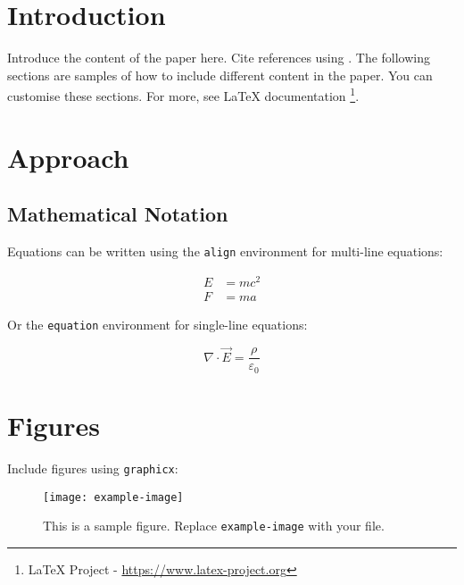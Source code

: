 \documentclass[twoside]{article}
\title{\customtitle{Your Paper Title}}
\author{
    Author One$^1$, Author Two$^2$, Author Three$^1$ \\
    {$^1$Affiliation One, $^2$Affiliation Two} \\
    \texttt{author.one@example.com, author.two@example.com, author.three@example.com}
}
\date{}
\begin{document}
\maketitle

\begin{abstract}
This is the abstract. It summarises the paper's key contributions in a maximum of 200 words.
\end{abstract}


\section{Introduction}

Introduce the content of the paper here. Cite references using \cite{example}. The following sections are samples of how to include different content in the paper. You can customise these sections. For more, see LaTeX documentation \footnote{LaTeX Project - \url{https://www.latex-project.org}}.


\section{Approach}

\subsection{Mathematical Notation}

Equations can be written using the \texttt{align} environment for multi-line equations:

\begin{align}
    E &= mc^2 \\
    F &= ma
\end{align}

Or the \texttt{equation} environment for single-line equations:

\begin{equation}
    \nabla \cdot \vec{E} = \frac{\rho}{\varepsilon_0}
\end{equation}

\section{Figures}

Include figures using \texttt{graphicx}:

\begin{figure}[ht]
    \centering
    \texttt{[image: example-image]}
    \caption{This is a sample figure. Replace \texttt{example-image} with your file.}
    \label{fig:example}
\end{figure}
\end{document}
